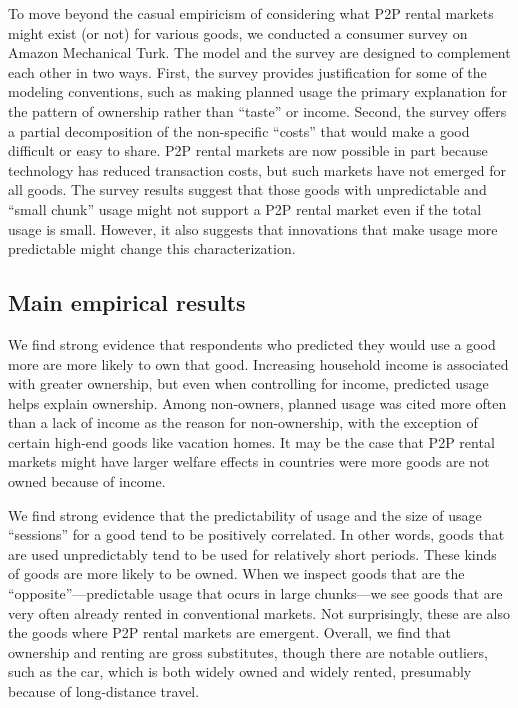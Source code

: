 \documentclass[11pt]{article}
\begin{document}
To move beyond the casual empiricism of considering what P2P rental markets might exist (or not) for various goods, we conducted a consumer survey on Amazon Mechanical Turk. 
The model and the survey are designed to complement each other in two ways. 
First, the survey provides justification for some of the modeling conventions, such as making planned usage the primary explanation for the pattern of ownership rather than ``taste'' or income. 
Second, the survey offers a partial decomposition of the non-specific ``costs'' that would make a good difficult or easy to share.  
P2P rental markets are now possible in part because technology has reduced transaction costs, but such markets have not emerged for all goods. 
The survey results suggest that those goods with unpredictable and ``small chunk'' usage might not support a P2P rental market even if the total usage is small. 
However, it also suggests that innovations that make usage more predictable might change this characterization.  

\subsection{Main empirical results}
We find strong evidence that respondents who predicted they would use a good more are more likely to own that good.
Increasing household income is associated with greater ownership, but even when controlling for income, predicted usage helps explain ownership. 
Among non-owners, planned usage was cited more often than a lack of income as the reason for non-ownership, with the exception of certain high-end goods like vacation homes.
It may be the case that P2P rental markets might have larger welfare effects in countries were more goods are not owned because of income.

We find strong evidence that the predictability of usage and the size of usage ``sessions'' for a good tend to be positively correlated.
In other words, goods that are used unpredictably tend to be used for relatively short periods.
These kinds of goods are more likely to be owned. 
When we inspect goods that are the ``opposite''---predictable usage that ocurs in large chunks---we see goods that are very often already rented in conventional markets.
Not surprisingly, these are also the goods where P2P rental markets are emergent.
Overall, we find that ownership and renting are gross substitutes, though there are notable outliers, such as the car, which is both widely owned and widely rented, presumably because of long-distance travel. 
\end{document}
